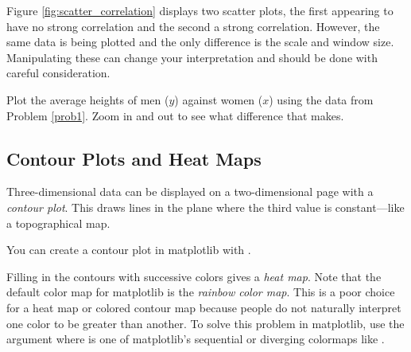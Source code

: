 Figure \ref{fig:scatter_correlation} displays two scatter plots, the first appearing to have no strong correlation and the second a strong correlation. However, the same data is being plotted and the only difference is the scale and window size. Manipulating these can change your interpretation and should be done with careful consideration.

\begin{problem}
Plot the average heights of men ($y$) against women ($x$) using the data from Problem \ref{prob1}. Zoom in and out to see what difference that makes.
\end{problem}




\subsection*{Contour Plots and Heat Maps}

Three-dimensional data can be displayed on a two-dimensional page with a \emph{contour plot}.  This draws lines in the plane where the third value is constant---like a topographical map.  

You can create a contour plot in matplotlib with 
.

Filling in the contours with successive colors gives a  \emph{heat map}. Note that the default color map for matplotlib is the  \emph{rainbow color map}.  This is a poor choice for a heat map or colored contour map because people do not naturally interpret one color to be greater than another.  To solve this problem in matplotlib, use the argument 
where  is one of matplotlib's sequential or diverging colormaps like . 

